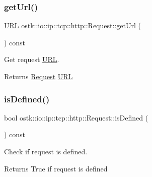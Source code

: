 \subsubsection{\texorpdfstring{get\+Url()}{getUrl()}}
{\footnotesize\ttfamily \hyperlink{classostk_1_1io_1_1_u_r_l}{U\+RL} ostk\+::io\+::ip\+::tcp\+::http\+::\+Request\+::get\+Url (\begin{DoxyParamCaption}{ }\end{DoxyParamCaption}) const}



Get request \hyperlink{classostk_1_1io_1_1_u_r_l}{U\+RL}. 

\begin{DoxyReturn}{Returns}
\hyperlink{classostk_1_1io_1_1ip_1_1tcp_1_1http_1_1_request}{Request} \hyperlink{classostk_1_1io_1_1_u_r_l}{U\+RL} 
\end{DoxyReturn}
\mbox{\label{classostk_1_1io_1_1ip_1_1tcp_1_1http_1_1_request_ac01119273b40874c0bb6a687fe7266b7}} 
\subsubsection{\texorpdfstring{is\+Defined()}{isDefined()}}
{\footnotesize\ttfamily bool ostk\+::io\+::ip\+::tcp\+::http\+::\+Request\+::is\+Defined (\begin{DoxyParamCaption}{ }\end{DoxyParamCaption}) const}



Check if request is defined. 

\begin{DoxyReturn}{Returns}
True if request is defined 
\end{DoxyReturn}
\mbox{\label{classostk_1_1io_1_1ip_1_1tcp_1_1http_1_1_request_aebda9e8cb66ad693422238e5bad8b91a}} 
